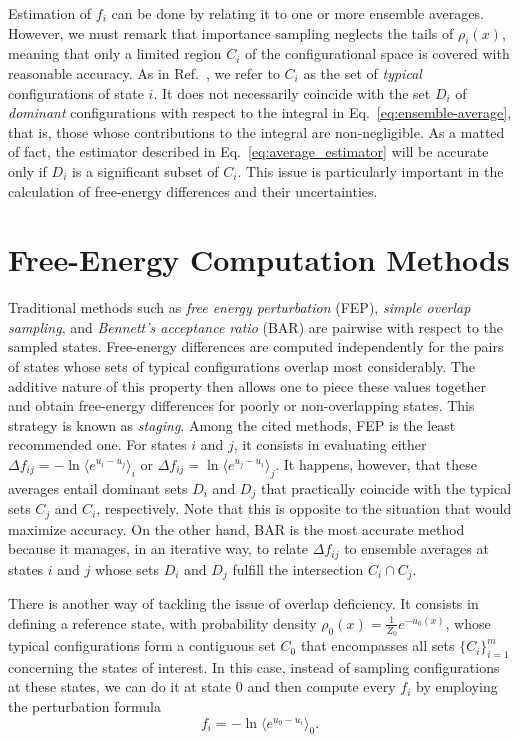 \documentclass[aip,jcp,reprint,amsmath,amssymb]{revtex4-1}
\begin{document}
Estimation of $f_i$ can be done by relating it to one or more ensemble averages. However, we must remark that importance sampling neglects the tails of $\rho_i(x)$, meaning that only a limited region $C_i$ of the configurational space is covered with reasonable accuracy. As in Ref.~, we refer to $C_i$ as the set of \textit{typical} configurations of state $i$. It does not necessarily coincide with the set $D_i$ of \textit{dominant} configurations with respect to the integral in Eq.~\eqref{eq:ensemble-average}, that is, those whose contributions to the integral are non-negligible. As a matted of fact, the estimator described in Eq.~\eqref{eq:average_estimator} will be accurate only if $D_i$ is a significant subset of $C_i$. This issue is particularly important in the calculation of free-energy differences and their uncertainties.

\section{Free-Energy Computation Methods}

Traditional methods such as \textit{free energy perturbation} (FEP),\cite{Zwanzig_1954} \textit{simple overlap sampling},\cite{Lee_1980, Lu_2003} and \textit{Bennett's acceptance ratio} (BAR)\cite{Bennett_1976} are pairwise with respect to the sampled states. Free-energy differences are computed independently for the pairs of states whose sets of typical configurations overlap most considerably. The additive nature of this property then allows one to piece these values together and obtain free-energy differences for poorly or non-overlapping states. This strategy is known as \textit{staging}.\cite{Kofke_1998} Among the cited methods, FEP is the least recommended one. For states $i$ and $j$, it consists in evaluating either $\Delta f_{ij} = -\ln \langle e^{u_i - u_j} \rangle_i$ or $\Delta f_{ij} = \ln \langle e^{u_j - u_i} \rangle_j$.\cite{Zwanzig_1954} It happens, however, that these averages entail dominant sets $D_i$ and $D_j$ that practically coincide with the typical sets $C_j$ and $C_i$, respectively.\cite{Jarzynski_2006} Note that this is opposite to the situation that would maximize accuracy. On the other hand, BAR is the most accurate method because it manages, in an iterative way, to relate $\Delta f_{ij}$ to ensemble averages at states $i$ and $j$ whose sets $D_i$ and $D_j$ fulfill the intersection $C_i \cap C_j$.

There is another way of tackling the issue of overlap deficiency. It consists in defining a reference state, with probability density $\rho_0(x) = \frac{1}{Z_0}e^{-u_0(x)}$, whose typical configurations form a contiguous set $C_0$ that encompasses all sets $\{C_i\}_{i=1}^m$ concerning the states of interest. In this case, instead of sampling configurations at these states, we can do it at state $0$ and then compute every $f_i$ by employing the perturbation formula
\begin{equation}
\label{eq:umbrella sampling free energy}
f_i = -\ln \langle e^{u_0-u_i} \rangle_0.
\end{equation}
\end{document}
